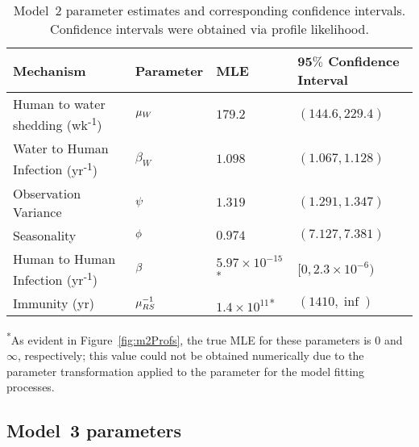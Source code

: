 \begin{table}[!h]
\centering
\caption[Model~2 parameter estimates and corresponding confidence intervals.]{\label{tab:mod2CI}
Model~2 parameter estimates and corresponding confidence intervals. Confidence intervals were obtained via profile likelihood.}
\vspace{2mm}
\begin{tabular}{|L{3.25cm}|C{2.1cm}|C{1.9cm}|C{4.2cm}|}
\hline
\centering \textbf{Mechanism} & \textbf{Parameter} & \textbf{MLE} & $\bm{95\%}$ \textbf{Confidence Interval} \\
\hline
\hline

 Human to water shedding {\small (wk\textsuperscript{-1})} & $\mu_W$ & $179.2$
   &
  $(144.6, 229.4)$
\\
\hline

 Water to Human Infection {\small (yr\textsuperscript{-1})} & $\beta_W$ & $1.098$
   &
  $(1.067, 1.128)$
\\
\hline

 Observation Variance & $\psi$ & $1.319$
   &
  $(1.291, 1.347)$
\\
\hline

 Seasonality & $\phi$ & $0.974$
   &
  $(7.127, 7.381)$
\\
\hline

Human to Human Infection {\small (yr\textsuperscript{-1})} & $\beta$ & $\ensuremath{5.97\times 10^{-15}}$\textsuperscript{*}
   &
  $[0, \ensuremath{2.3\times 10^{-6}})$
\\
\hline

Immunity {\small (yr)} & $\mu_{RS}^{-1}$ & $\ensuremath{1.4\times 10^{11}}$\textsuperscript{*}
   &
  $(1410, \inf)$
\\
\hline

\end{tabular}
\begin{flushleft}
\textsuperscript{*}As evident in Figure~\ref{fig:m2Profs}, the true MLE for these parameters is $0$ and $\infty$, respectively; this value could not be obtained numerically due to the parameter transformation applied to the parameter for the model fitting processes.
\end{flushleft}
\end{table}

\subsection{Model~3 parameters}

